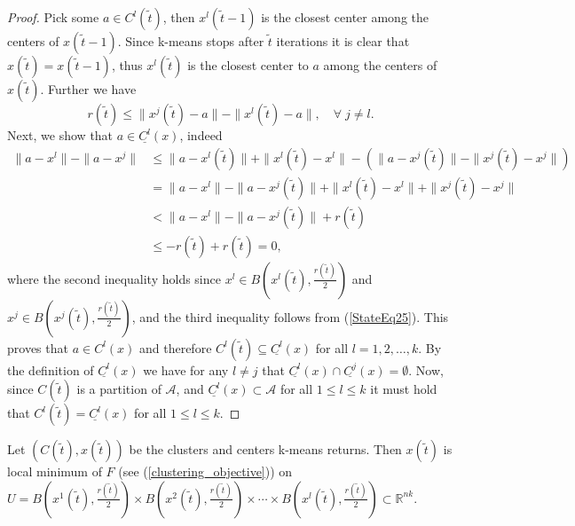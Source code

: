 \begin{proof}
Pick some $a \in C^l(\widetilde{t})$, then $x^l(\widetilde{t}-1)$ is the closest center among the centers of $x(\widetilde{t}-1)$. Since k-means stops after $\widetilde{t}$ iterations it is clear that $x(\widetilde{t})=x(\widetilde{t}-1)$, thus $x^l(\widetilde{t})$ is the closest center to $a$ among the centers of $x(\widetilde{t})$. Further we have
\begin{equation}
	r(\widetilde{t}) \leq \|x^j(\widetilde{t}) - a\| - \|x^l(\widetilde{t}) -a\|, \quad \forall \; j \neq l . \label{StateEq25}
\end{equation}
Next, we show that $a \in \underline{C^l}(x)$, indeed
\begin{align*}
	\|a - x^l\| -  \|a - x^j\| &\leq \|a - x^l(\widetilde{t})\| + \|x^l(\widetilde{t}) - x^l\| - \left( \|a - x^j(\widetilde{t})\| - \|x^j(\widetilde{t}) - x^j\| \right) \\
	& = \|a - x^l\| - \|a - x^j(\widetilde{t})\| + \|x^l(\widetilde{t}) - x^l\| + \|x^j(\widetilde{t}) - x^j\| \\
	& < \|a - x^l\| - \|a - x^j(\widetilde{t})\| + r(\widetilde{t}) \\
	& \leq -r(\widetilde{t}) + r(\widetilde{t}) = 0 ,
\end{align*}
where the second inequality holds since $x^l \in B\left( x^l(\widetilde{t}), \frac{r(\widetilde{t})}{2} \right)$ and $x^j \in B\left( x^j(\widetilde{t}), \frac{r(\widetilde{t})}{2} \right)$, and the third inequality follows from (\ref{StateEq25}). This proves that $a \in C^l(x)$ and therefore $C^l(\widetilde{t}) \subseteq \underline{C^l}(x)$ for all $l=1,2,\ldots,k$. 
By the definition of $\underline{C^l}(x)$ we have for any $l \neq j$ that $\underline{C^l}(x) \cap \underline{C^j}(x)=\emptyset$. Now, since $C(\widetilde{t})$ is a partition of $\mathcal{A}$, and $\underline{C^l}(x) \subset \mathcal{A}$ for all $1 \leq l \leq k$ it must hold that $C^l(\widetilde{t}) = \underline{C^l}(x)$ for all $1 \leq l \leq k$.
\end{proof}

\begin{proposition}
Let $\left(C(\widetilde{t}), x(\widetilde{t})\right)$ be the clusters and centers k-means returns. Then $x(\widetilde{t})$ is local minimum of $F$ (see (\ref{clustering_objective})) on $U = B\left( x^1(\widetilde{t}),\frac{r(\widetilde{t})}{2}\right) \times  B\left( x^2(\widetilde{t}),\frac{r(\widetilde{t})}{2}\right) \times \cdots \times B\left( x^l(\widetilde{t}),\frac{r(\widetilde{t})}{2} \right) \subset \mathbb{R}^{nk}$.
\end{proposition}

